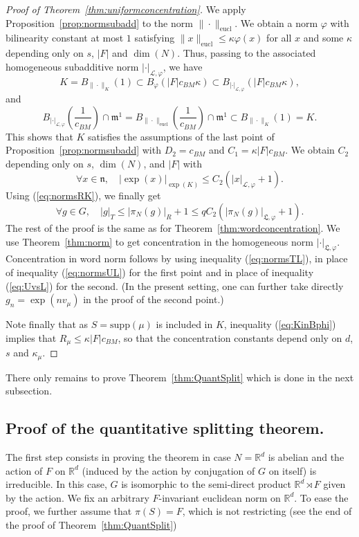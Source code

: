 \documentclass[11pt,leqno]{article}
\theoremstyle{plain}
\theoremstyle{definition}
\theoremstyle{remark}
\numberwithin{equation}{section}
\newcommand{\R}{\mathbb{R}}
\begin{document}
\begin{proof}[Proof of Theorem~\ref{thm:uniformconcentration}]
We apply Proposition~\ref{prop:normsubadd} to the norm $\|\cdot\|_{\mathrm{eucl}}$. We obtain a norm $\varphi$ with bilinearity constant at most $1$ satisfying $\|x\|_{\mathrm{eucl}}\le \kappa \varphi(x)$ for all $x$ and some $\kappa$ depending only on $s$, $|F|$ and $\dim(N)$. Thus, passing to the associated homogeneous subadditive norm $|\cdot|_{\mathcal{L},\varphi}$, we have
\begin{equation}\label{eq:KinBphi}
K=B_{\|\cdot\|_K}(1) \subset B_\varphi(|F|c_{BM}\kappa)\subset B_{|\cdot|_{\mathcal{L},\varphi}}(|F|c_{BM}\kappa),
\end{equation}
and 
\[
B_{|\cdot|_{\mathcal{L},\varphi}}\left(\frac{1}{c_{BM}}\right)\cap \mathfrak{m}^1=B_{\|\cdot\|_{\mathrm{eucl}}}\left(\frac{1}{c_{BM}}\right)\cap \mathfrak{m}^1 \subset B_{\|\cdot\|_K}(1)=K.
\]
This shows that $K$ satisfies the assumptions of the last point of Proposition~\ref{prop:normsubadd} with $D_2=c_{BM}$ and $C_1=\kappa|F|c_{BM}$. We obtain $C_2$ depending only on $s$, $\dim(N)$, and $|F|$ with
\[
\forall x \in \mathfrak{n}, \quad |\exp(x)|_{\exp(K)} \le C_2(|x|_{\mathcal{L},\varphi}+1).
\]
Using (\ref{eq:normsRK}), we finally get
\begin{equation}\label{eq:normsTL}
\forall g \in G, \quad |g|_T\le |\pi_N(g)|_R+1 \le qC_2\left(|\pi_N(g)|_{\mathfrak{L},\varphi}+1\right).
\end{equation}
The rest of the proof is the same as for Theorem~\ref{thm:wordconcentration}. We use Theorem~\ref{thm:norm} to get concentration in the homogeneous norm $|\cdot|_{\mathfrak{L},\varphi}$. Concentration in word norm follows by using inequality (\ref{eq:normsTL}), in place of inequality (\ref{eq:normsUL}) for the first point and in place of inequality (\ref{eq:UvsL}) for the second. (In the present setting, one can further take directly $g_n=\exp(nv_\mu)$ in the proof of the second point.)


Note finally that as $S=\mathrm{supp}(\mu)$ is included in $K$, inequality (\ref{eq:KinBphi}) implies that $R_\mu \le \kappa|F|c_{BM}$, so that the concentration constants depend only on $d$, $s$ and $\kappa_\mu$.
\end{proof}

There only remains to prove Theorem~\ref{thm:QuantSplit} which is done in the next subsection.


\subsection{Proof of the quantitative splitting theorem.}
The first step consists in proving the theorem in case $N=\R^d$ is abelian and the action of $F$ on $\R^d$ (induced by the action by conjugation of $G$ on itself) is irreducible. In this case, $G$ is isomorphic to the semi-direct product $\R^d \rtimes F$ given by the action. We fix an arbitrary $F$-invariant euclidean norm on $\R^d$. To ease the proof, we further assume that $\pi(S)=F$, which is not restricting (see the end of the proof of Theorem~\ref{thm:QuantSplit})
\end{document}
